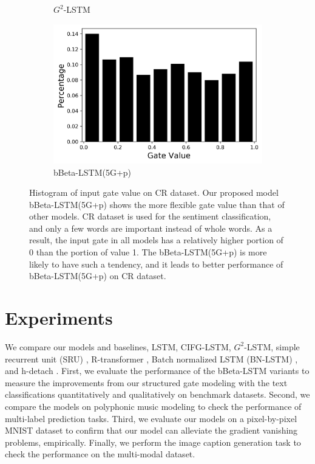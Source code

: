 \documentclass[letterpaper]{article} %
\begin{document}
\begin{figure}[h]
\begin{subfigure}{.48\columnwidth}
		\caption{$G^{2}$-LSTM}
	\end{subfigure}
	\begin{subfigure}{.48\columnwidth}
		\centering
		\includegraphics[width=\linewidth]{sample_cr_tr_input_bBLSTM_5G.png}
		\caption{bBeta-LSTM(5G+p)}
	\end{subfigure}
	\caption{Histogram of input gate value on CR dataset. Our proposed model bBeta-LSTM(5G+p) shows the more flexible gate value than that of other models. CR dataset is used for the sentiment classification, and only a few words are important instead of whole words. As a result, the input gate in all models has a relatively higher portion of 0 than the portion of value 1. The bBeta-LSTM(5G+p) is more likely to have such a tendency, and it leads to better performance of bBeta-LSTM(5G+p) on CR dataset.
	}
	\label{fig:cr_gate_histogram}
\end{figure}
\section{Experiments}
We compare our models and baselines, LSTM, CIFG-LSTM, $G^{2}$-LSTM, simple recurrent unit (SRU) \cite{sru}, R-transformer \cite{wang2019rtransf}, Batch normalized LSTM (BN-LSTM) \cite{cooijmans2016recurrent}, and h-detach \cite{hdetach2019}.
First, we evaluate the performance of the bBeta-LSTM variants to measure the improvements from our structured gate modeling with the text classifications quantitatively and qualitatively on benchmark datasets.
Second, we compare the models on polyphonic music modeling to check the performance of multi-label prediction tasks.
Third, we evaluate our models on a pixel-by-pixel MNIST dataset to confirm that our model can alleviate the gradient vanishing problems, empirically.
Finally, we perform the image caption generation task to check the performance on the multi-modal dataset.
\end{document}
